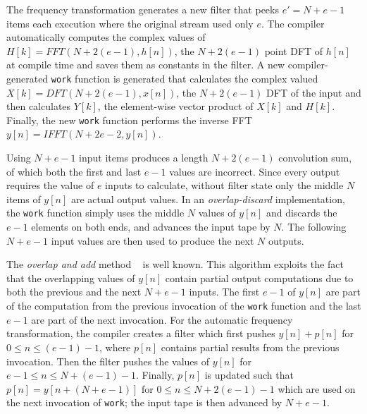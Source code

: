 The frequency transformation generates a new filter that
peeks $e'=N+e-1$ items each execution where the original stream used only $e$.
The compiler automatically computes the complex values of
$H[k]=FFT(N+2(e-1),h[n])$, the $N+2(e-1)$ point DFT of $h[n]$ at compile
time and saves them as constants in the filter.
A new compiler-generated {\tt work} function is generated that calculates the complex 
valued $X[k]=DFT(N+2(e-1),x[n])$, the $N+2(e-1)$ DFT of the input and 
then calculates $Y[k]$, the element-wise vector product 
of $X[k]$ and $H[k]$. Finally, the new {\tt work} function performs
the inverse FFT $y[n]=IFFT(N+2e-2,y[n])$.

Using $N+e-1$ input items produces a length $N+2(e-1)$ convolution sum, 
of which both the first and last $e-1$ values are incorrect. Since every output requires 
the value of $e$ inputs to calculate, without filter state 
only the middle $N$ items of $y[n]$ are actual output values. 
In an {\it overlap-discard} implementation, the {\tt work} function simply
uses the middle $N$ values of $y[n]$ and discards the 
$e-1$ elements on both ends, and advances the input tape by $N$.
The following $N+e-1$ input values are then used to produce the next $N$ outputs.

The {\it overlap and add} method ~\cite{oppenheim-discrete} is well
known.  This algorithm exploits the fact that the overlapping values
of $y[n]$ contain partial output computations due to both the previous
and the next $N+e-1$ inputs.  The first $e-1$ of $y[n]$ are part of
the computation from the previous invocation of the {\tt work}
function and the last $e-1$ are part of the next invocation.  For the
automatic frequency transformation, the compiler creates a filter
which first pushes $y[n]+p[n]$ for $0 \le n \le (e-1)-1$, where $p[n]$
contains partial results from the previous invocation. Then the filter
pushes the values of $y[n]$ for $e-1 \le n \le N+(e-1)-1$.  Finally,
$p[n]$ is updated such that $p[n]=y[n+(N+e-1)]$ for $0 \le n \le
N+2(e-1)-1$ which are used on the next invocation of {\tt work}; the
input tape is then advanced by $N+e-1$.

